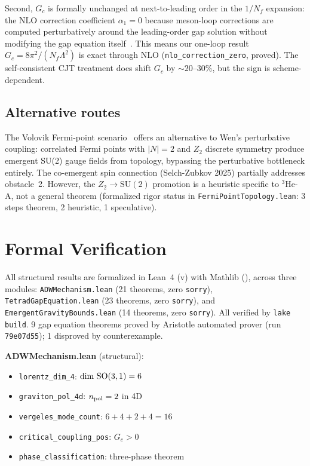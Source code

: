 \documentclass[aps,prd,twocolumn,superscriptaddress,nofootinbib]{revtex4-2}
\begin{document}
Second, $G_c$ is formally unchanged at next-to-leading order in the
$1/N_f$ expansion: the NLO correction coefficient $\alpha_1 = 0$ because
meson-loop corrections are computed perturbatively around the leading-order
gap solution without modifying the gap equation itself~\cite{Oertel2000}.
This means our one-loop result $G_c = 8\pi^2/(N_f\Lambda^2)$ is exact
through NLO (\texttt{nlo\_correction\_zero}, proved). The self-consistent CJT
treatment does shift $G_c$ by ${\sim}20\text{--}30\%$, but the sign is
scheme-dependent.

\subsection{Alternative routes}

The Volovik Fermi-point scenario~\cite{Volovik2003} offers an alternative
to Wen's perturbative coupling: correlated Fermi points with $|N| = 2$ and
$Z_2$ discrete symmetry produce emergent SU(2) gauge fields from topology,
bypassing the perturbative bottleneck entirely. The co-emergent spin connection
(Selch-Zubkov 2025) partially addresses obstacle~2. However, the
$Z_2 \to \mathrm{SU}(2)$ promotion is a heuristic specific to $^3$He-A, not a
general theorem (formalized rigor status in \texttt{FermiPointTopology.lean}:
3 steps theorem, 2 heuristic, 1 speculative).

\section{Formal Verification}

All structural results are formalized in Lean~4 (v\leantoolchain) with Mathlib
(\texttt{\mathlibrev}), across three modules: \texttt{ADWMechanism.lean}
(21 theorems, zero \texttt{sorry}), \texttt{TetradGapEquation.lean}
(23 theorems, zero \texttt{sorry}), and \texttt{EmergentGravityBounds.lean}
(14 theorems, zero \texttt{sorry}).
All verified by \texttt{lake build}. 9 gap equation theorems proved by
Aristotle automated prover (run \texttt{79e07d55}); 1 disproved by counterexample.

\textbf{ADWMechanism.lean} (structural):
\begin{itemize}
\item \texttt{lorentz\_dim\_4}: $\dim\, {\rm SO}(3,1) = 6$
\item \texttt{graviton\_pol\_4d}: $n_{\rm pol} = 2$ in 4D
\item \texttt{vergeles\_mode\_count}: $6+4+2+4 = 16$
\item \texttt{critical\_coupling\_pos}: $G_c > 0$
\item \texttt{phase\_classification}: three-phase theorem
\end{itemize}
\end{document}
